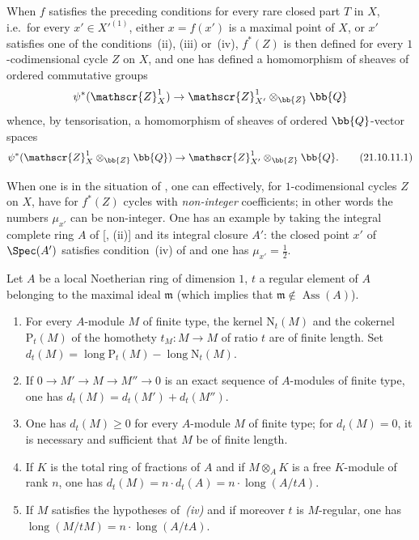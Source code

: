 \begin{env}[21.10.11]

When $f$ satisfies the preceding conditions for every rare closed part $T$ in $X$, i.e.\ for every $x'\in X'^{(1)}$, either $x=f(x')$ is a maximal point of $X$, or $x'$ satisfies one of the conditions~(ii), (iii) or~(iv), $f^*(Z)$ is then defined for every $1$-codimensional cycle $Z$ on $X$, and one has defined a homomorphism of sheaves of ordered commutative groups
\[
  \psi^*(\mathscr{Z}_X^1)\to\mathscr{Z}_{X'}^1\otimes_{\bb{Z}}\bb{Q}
\]
whence, by tensorisation, a homomorphism of sheaves of ordered $\bb{Q}$-vector spaces
\[
\label{IV.21.10.11.1}
  \psi^*(\mathscr{Z}_X^1\otimes_{\bb{Z}}\bb{Q})\to\mathscr{Z}_{X'}^1\otimes_{\bb{Z}}\bb{Q}.
  \tag{21.10.11.1}
\]
\end{env}

\begin{remark}[21.10.12]
\label{IV.21.10.12}
When one is in the situation of , one can effectively, for $1$-codimensional cycles $Z$ on $X$, have for $f^*(Z)$ cycles with \emph{non-integer} coefficients;
in other words the numbers $\mu_{x'}$ can be non-integer.
One has an example by taking the integral complete ring $A$ of [, (ii)] and its integral closure $A'$:
the closed point $x'$ of $\Spec(A')$ satisfies condition~(iv) of  and one has $\mu_{x'}=\frac{1}{2}$.
\end{remark}

\begin{lemma}[21.10.13]
\label{IV.21.10.13}
Let $A$ be a local Noetherian ring of dimension $1$, $t$ a regular element of $A$ belonging to the maximal ideal $\mathfrak{m}$ (which implies that $\mathfrak{m}\notin\operatorname{Ass}(A)$).
\begin{enumerate}[label=\emph{(\roman*)}]
  \item For every $A$-module $M$ of finite type, the kernel $\mathrm{N}_t(M)$ and the cokernel $\mathrm{P}_t(M)$ of the homothety $t_M:M\to M$ of ratio $t$ are of finite length. Set $d_t(M)=\operatorname{long}\mathrm{P}_t(M)-\operatorname{long}\mathrm{N}_t(M)$.
  \item If $0\to M'\to M\to M''\to 0$ is an exact sequence of $A$-modules of finite type, one has $d_t(M)=d_t(M')+d_t(M'')$.
  \item One has $d_t(M)\geq 0$ for every $A$-module $M$ of finite type; for $d_t(M)=0$, it is necessary and sufficient that $M$ be of finite length.
  \item If $K$ is the total ring of fractions of $A$ and if $M\otimes_A K$ is a free $K$-module of rank $n$, one has $d_t(M)=n\cdot d_t(A)=n\cdot\operatorname{long}(A/tA)$.
  \item If $M$ satisfies the hypotheses of~\emph{(iv)} and if moreover $t$ is $M$-regular, one has $\operatorname{long}(M/tM)=n\cdot\operatorname{long}(A/tA)$.
\end{enumerate}
\end{lemma}

